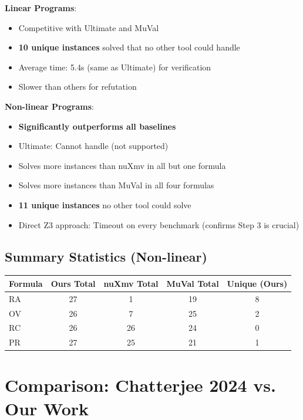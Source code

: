 \documentclass{article}
\begin{document}
\begin{enumerate}
\textbf{Linear Programs}:
\begin{itemize}
    \item Competitive with Ultimate and MuVal
    \item \textbf{10 unique instances} solved that no other tool could handle
    \item Average time: 5.4s (same as Ultimate) for verification
    \item Slower than others for refutation
\end{itemize}

\textbf{Non-linear Programs}:
\begin{itemize}
    \item \textbf{Significantly outperforms all baselines}
    \item Ultimate: Cannot handle (not supported)
    \item Solves more instances than nuXmv in all but one formula
    \item Solves more instances than MuVal in all four formulas
    \item \textbf{11 unique instances} no other tool could solve
    \item Direct Z3 approach: Timeout on every benchmark (confirms Step 3 is crucial)
\end{itemize}

\subsection{Summary Statistics (Non-linear)}

\begin{center}
\begin{tabular}{lcccc}
\hline
Formula & Ours Total & nuXmv Total & MuVal Total & Unique (Ours) \\
\hline
RA & 27 & 1 & 19 & 8 \\
OV & 26 & 7 & 25 & 2 \\
RC & 26 & 26 & 24 & 0 \\
PR & 27 & 25 & 21 & 1 \\
\hline
\end{tabular}
\end{center}

\section{Comparison: Chatterjee 2024 vs. Our Work}


\end{enumerate}
\end{document}
